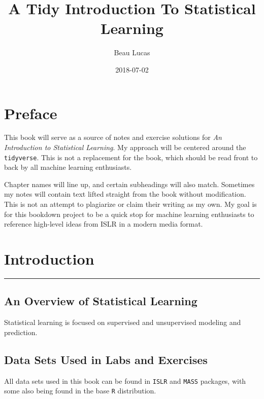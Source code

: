 \documentclass[]{book}
\title{A Tidy Introduction To Statistical Learning}
\author{Beau Lucas}
\date{2018-07-02}
\theoremstyle{definition}
\theoremstyle{definition}
\theoremstyle{definition}
\theoremstyle{remark}
\begin{document}
\maketitle

{
\setcounter{tocdepth}{1}
\tableofcontents
}
\chapter*{Preface}\label{preface}

This book will serve as a source of notes and exercise solutions for
\emph{An Introduction to Statistical Learning}. My approach will be
centered around the \texttt{tidyverse}. This is not a replacement for
the book, which should be read front to back by all machine learning
enthusiasts.

Chapter names will line up, and certain subheadings will also match.
Sometimes my notes will contain text lifted straight from the book
without modification. This is not an attempt to plagiarize or claim
their writing as my own. My goal is for this bookdown project to be a
quick stop for machine learning enthusiasts to reference high-level
ideas from ISLR in a modern media format.

\chapter{Introduction}\label{intro}

\begin{center}\rule{0.5\linewidth}{\linethickness}\end{center}

\section{An Overview of Statistical
Learning}\label{an-overview-of-statistical-learning}

Statistical learning is focused on supervised and unsupervised modeling
and prediction.

\section{Data Sets Used in Labs and
Exercises}\label{data-sets-used-in-labs-and-exercises}

All data sets used in this book can be found in \texttt{ISLR} and
\texttt{MASS} packages, with some also being found in the base
\texttt{R} distribution.
\end{document}
